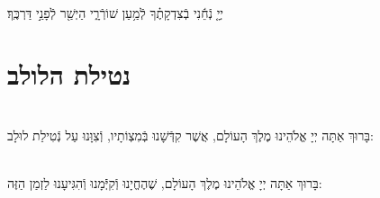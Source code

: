 \documentclass[twoside, openany, parskip=half, 11pt]{book}
\begin{document}
\vspace{-.5\baselineskip}

\\
 יְיָ֤ נְֿחֵ֬נִי בְֿצִדְקָתֶ֗ךָ לְֿמַ֥עַן שׁוֹרְֿרָ֑י הַיְשַׁ֖ר לְֿפָנַ֣י דַּרְכֶּֽךָ׃

\vfill

\quad{}\quad{}






\section[נטילת הלולב]{ נטילת הלולב }
\label{lulav}
\\
בָּרוּךְ אַתָּה יְיָ אֱלֹהֵינוּ מֶלֶךְ הָעוֹלָם, אֲשֶׁר קִדְּֿשָׁנוּ בְּֿמִצְוֹתָיו, וְֿצִוָּנוּ עַל נְֿטִילַת לוּלָב:



\\
בָּרוּךְ אַתָּה יְיָ אֱלֹהֵינוּ מֶלֶךְ הָעוֹלָם, שֶׁהֶחֱיָנוּ וְֿקִיְּֿֿמָנוּ וְֿהִגִּיעָנוּ לַזְמַן הַזֶּה:
\end{document}
